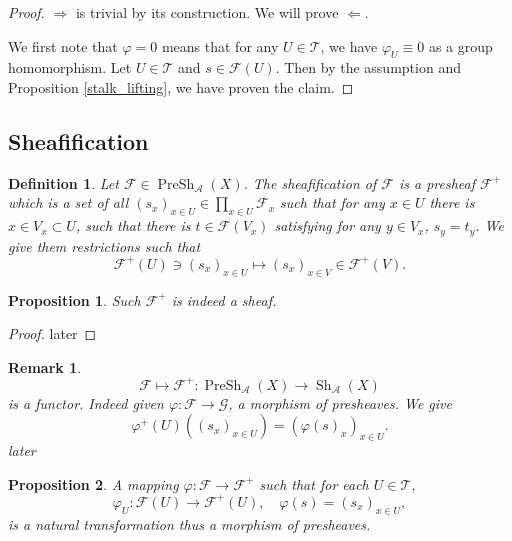 \documentclass{article}
\newtheorem{proposition}{Proposition}[section]
\newtheorem{definition}{Definition}[section]
\newtheorem{remark}{Remark}[section]
\numberwithin{equation}{section}
\DeclareMathOperator{\PreSh}{PreSh}
\DeclareMathOperator{\Sh}{Sh}
\begin{document}
\begin{proof}
$\Rightarrow$ is trivial by its construction. We will prove $\Leftarrow$.\\
\par We first note that $\varphi=0$ means that for any $U\in \mathcal{T}$, we have $\varphi_U\equiv0$ as a group homomorphism. Let $U\in\mathcal{T}$ and $s\in\mathcal{F}(U)$. Then by the assumption and Proposition \ref{stalk_lifting}, we have proven the claim.
\end{proof}

\subsection{Sheafification}

\begin{definition}
Let $\mathcal{F}\in\PreSh_\mathcal{A}(X)$. The sheafification of $\mathcal{F}$ is a presheaf $\mathcal{F}^+$ which is a set of all $(s_x)_{x\in U}\in\prod_{x\in U}\mathcal{F}_x$ such that
for any $x\in U$ there is $x\in V_x\subset U$, such that there is $t\in\mathcal{F}(V_x)$ satisfying for any $y\in V_x$, $s_y = t_y$. We give them restrictions such that
\begin{equation*}
\mathcal{F}^+(U)\ni (s_x)_{x\in U}\mapsto (s_x)_{x\in V}\in \mathcal{F}^+(V).
\end{equation*}
\end{definition}

\begin{proposition}
Such $\mathcal{F}^+$ is indeed a sheaf.
\end{proposition}

\begin{proof}
later
\end{proof}

\begin{remark}
\begin{equation*}
\mathcal{F}\mapsto\mathcal{F}^+:\PreSh_\mathcal{A}(X)\to\Sh_\mathcal{A}(X)
\end{equation*}
is a functor. Indeed given $\varphi:\mathcal{F}\to\mathcal{G}$, a morphism of presheaves. We give
\begin{equation*}
\varphi^+(U)((s_x)_{x\in U}) = (\varphi(s)_x)_{x\in U}.
\end{equation*}
later
\end{remark}

\begin{proposition}
A mapping $\varphi:\mathcal{F}\to\mathcal{F}^+$ such that for each $U\in\mathcal{T}$, 
\begin{equation*}
\varphi_U:\mathcal{F}(U)\to\mathcal{F}^+(U),\quad \varphi(s)=(s_x)_{x\in U},
\end{equation*}
is a natural transformation thus a morphism of presheaves.
\end{proposition}
\end{document}
